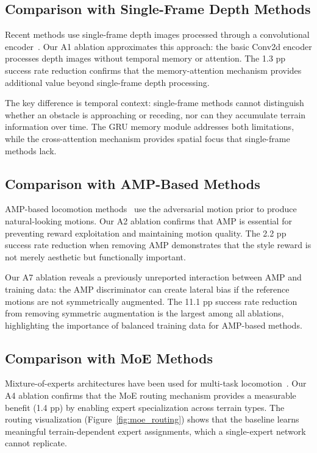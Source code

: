 \subsection{Comparison with Single-Frame Depth Methods}

Recent methods use single-frame depth images processed through a convolutional encoder~\cite{zhu2024hiking,zhuang2024humanoidparkour}. Our A1 ablation approximates this approach: the basic Conv2d encoder processes depth images without temporal memory or attention. The 1.3 pp success rate reduction confirms that the memory-attention mechanism provides additional value beyond single-frame depth processing.

The key difference is temporal context: single-frame methods cannot distinguish whether an obstacle is approaching or receding, nor can they accumulate terrain information over time. The GRU memory module addresses both limitations, while the cross-attention mechanism provides spatial focus that single-frame methods lack.

\subsection{Comparison with AMP-Based Methods}

AMP-based locomotion methods~\cite{peng2021amp,cheng2024extremeparkour} use the adversarial motion prior to produce natural-looking motions. Our A2 ablation confirms that AMP is essential for preventing reward exploitation and maintaining motion quality. The 2.2 pp success rate reduction when removing AMP demonstrates that the style reward is not merely aesthetic but functionally important.

Our A7 ablation reveals a previously unreported interaction between AMP and training data: the AMP discriminator can create lateral bias if the reference motions are not symmetrically augmented. The 11.1 pp success rate reduction from removing symmetric augmentation is the largest among all ablations, highlighting the importance of balanced training data for AMP-based methods.

\subsection{Comparison with MoE Methods}

Mixture-of-experts architectures have been used for multi-task locomotion~\cite{cheng2024extremeparkour}. Our A4 ablation confirms that the MoE routing mechanism provides a measurable benefit (1.4 pp) by enabling expert specialization across terrain types. The routing visualization (Figure~\ref{fig:moe_routing}) shows that the baseline learns meaningful terrain-dependent expert assignments, which a single-expert network cannot replicate.

